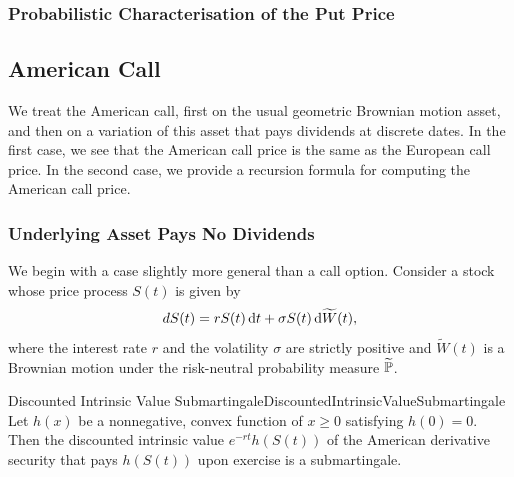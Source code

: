 \subsubsection{Probabilistic Characterisation of the Put Price}

\subsection{American Call}

We treat the American call, first on the usual geometric Brownian motion asset,  and then on a variation of this asset that pays dividends at discrete dates. In the first case, we see that the American call price is the same as the European call price. In the second case, we provide a recursion formula for computing the American call price.

\subsubsection{Underlying Asset Pays No Dividends}

We begin with a case slightly more general than a call option. Consider a stock whose price process \(S(t)\) is given by
\begin{equation}
	\label{eq:GeneralGBMRiskNeutral}
	dS(t) = rS(t) \, \mathrm{d} t + \sigma S(t) \, \mathrm{d} \widetilde{W}(t),
\end{equation}
where the interest rate \(r\) and the volatility \(\sigma\) are strictly positive and \(\widetilde{W}(t)\) is a Brownian motion under the risk-neutral probability measure \(\widetilde{\mathbb{P}}\).

\begin{lem}{Discounted Intrinsic Value Submartingale}{DiscountedIntrinsicValueSubmartingale}
	Let \(h(x)\) be a nonnegative, convex function of \(x \ge 0\) satisfying \(h(0) = 0\). Then the discounted intrinsic value \(e^{-rt}h(S(t))\) of the American derivative security that pays \(h(S(t))\) upon exercise is a submartingale.
\end{lem}

